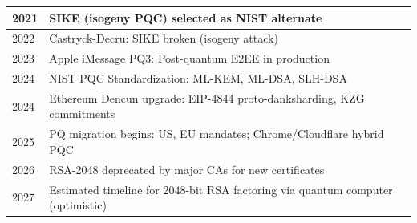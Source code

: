 \begin{tabularx}{\linewidth}{|l|X|}
2021 & SIKE (isogeny PQC) selected as NIST alternate \\ \hline
2022 & Castryck-Decru: SIKE broken (isogeny attack) \\ \hline
2023 & Apple iMessage PQ3: Post-quantum E2EE in production \\ \hline
2024 & NIST PQC Standardization: ML-KEM, ML-DSA, SLH-DSA \\ \hline
2024 & Ethereum Dencun upgrade: EIP-4844 proto-danksharding, KZG commitments \\ \hline
2025 & PQ migration begins: US, EU mandates; Chrome/Cloudflare hybrid PQC \\ \hline
2026 & RSA-2048 deprecated by major CAs for new certificates \\ \hline
2027 & Estimated timeline for 2048-bit RSA factoring via quantum computer (optimistic) \\ \hline
\end{tabularx}


